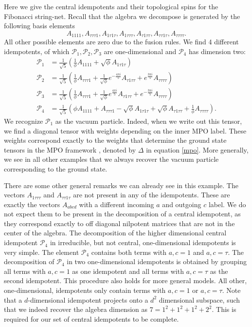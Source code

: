 \documentclass[12 pt]{article}
\begin{document}
Here we give the central idempotents and their topological spins for the Fibonacci string-net.
Recall that the algebra we decompose is generated by the following basis elements
$$
A_{1111}, A_{\tau\tau\tau 1}, A_{1\tau 1\tau}, A_{1\tau\tau\tau}, A_{\tau 1\tau\tau}, A_{\tau\tau 1\tau}, A_{\tau\tau\tau\tau}.
$$
All other possible elements are zero due to the fusion rules. We find 4 different idempotents, of which $\mathcal{P}_1,\mathcal{P}_2,\mathcal{P}_3$ are one-dimensional and $\mathcal{P}_4$ has dimension two:
\begin{align*}
\mathcal{P}_1&=\frac{1}{\sqrt{5}}\left(\frac{1}{\phi}A_{1111}+\sqrt{\phi}A_{1\tau 1\tau}\right)\\
\mathcal{P}_2&=\frac{1}{\sqrt{5}}\left(\frac{1}{\phi}A_{\tau\tau\tau 1}+\frac{1}{\sqrt{\phi}}e^{-\frac{4\pi i}{5}}A_{\tau 1\tau\tau}+e^{\frac{3\pi i}{5}}A_{\tau\tau\tau\tau}\right)\\
\mathcal{P}_3&=\frac{1}{\sqrt{5}}\left(\frac{1}{\phi}A_{\tau\tau\tau 1}+\frac{1}{\sqrt{\phi}}e^{\frac{4\pi i}{5}}A_{\tau 1\tau\tau}+e^{-\frac{3\pi i}{5}}A_{\tau\tau\tau\tau}\right)\\
\mathcal{P}_4&=\frac{1}{\sqrt{5}}\left(\phi A_{1111}+ A_{\tau\tau\tau 1} -\sqrt{\phi}A_{1\tau 1\tau}+\sqrt{\phi}A_{\tau 1\tau\tau}+\frac{1}{\phi}A_{\tau\tau\tau\tau}\right).
\end{align*}
We recognize $\mathcal{P}_1$ as the vacuum particle. Indeed, when we write out this tensor, we find a diagonal tensor with weights depending on the inner MPO label. These weights correspond exactly to the weights that determine the ground state tensors in the MPO framework \cite{MPOpaper}, denoted by $\Delta$ in equation \eqref{mpo}. More generally, we see in all other examples that we always recover the vacuum particle corresponding to the ground state.

There are some other general remarks we can already see in this example. The vectors $A_{1\tau\tau\tau}$ and $A_{\tau\tau 1\tau}$ are not present in any of the idempotents. These are exactly the vectors $A_{abcd}$ with a different incoming $a$ and outgoing $c$ label. We do not expect them to be present in the decomposition of a central idempotent, as they correspond exactly to off diagonal nilpotent matrices that are not in the center of the algebra. The decomposition of the higher dimensional central idempotent $\mathcal{P}_4$ in irreducible, but not central, one-dimensional idempotents is very simple. The element $\mathcal{P}_4$ contains both terms with $a,c=1$ and $a,c=\tau$. The decomposition of $\mathcal{P}_4$ in two one-dimensional idempotents is obtained by grouping all terms with $a,c=1$ as one idempotent and all terms with $a,c=\tau$ as the second idempotent. This procedure also holds for more general models. All other, one-dimensional, idempotents only contain terms with $a,c=1$ or $a,c= \tau$. Note that a $d$-dimensional idempotent projects onto a $d^2$ dimensional subspace, such that we indeed recover the algebra dimension as $7=1^2+1^2+1^2+2^2$. This is required for our set of central idempotents to be complete.
\end{document}
